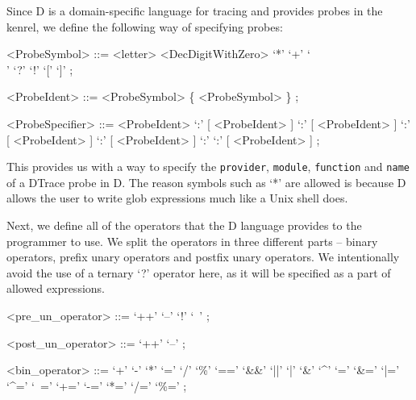 \noindent
Since D is a domain-specific language for tracing and provides probes in the
kenrel, we define the following way of specifying probes:

\begin{grammar}
<ProbeSymbol> ::=  <letter>
              \alt <DecDigitWithZero>
              \alt `*'
              \alt `+'
              \alt `\\'
              \alt `?'
              \alt `!'
              \alt `['
              \alt `]' ;

<ProbeIdent> ::= <ProbeSymbol> \{ <ProbeSymbol> \} ;

<ProbeSpecifier> ::=  <ProbeIdent>
                 \alt [ <ProbeIdent> ] `:' [ <ProbeIdent> ]
                 \alt [ <ProbeIdent> ] `:' [ <ProbeIdent> ] `:' [ <ProbeIdent> ]
                 \alt [ <ProbeIdent> ] `:' [ <ProbeIdent> ] `:' \newline
                      [ <ProbeIdent> ] `:' [ <ProbeIdent> ] ;
\end{grammar}

\noindent
This provides us with a way to specify the \texttt{provider}, \texttt{module},
\texttt{function} and \texttt{name} of a DTrace probe in D. The reason symbols
such as `*' are allowed is because D allows the user to write glob expressions
much like a Unix shell does. \newline

\noindent
Next, we define all of the operators that the D language provides to the
programmer to use. We split the operators in three different parts -- binary
operators, prefix unary operators and postfix unary operators. We intentionally
avoid the use of a ternary `?' operator here, as it will be specified as a part
of allowed expressions.
\begin{grammar}
<pre\_un\_operator> ::=  `++'
                    \alt `--'
                    \alt `!'
                    \alt `~' ;

<post\_un\_operator> ::=  `++'
                     \alt `--' ;

<bin\_operator> ::=  `+'
                \alt `-'
                \alt `*'
                \alt `='
                \alt `/'
                \alt `\%'
                \alt `=='
                \alt `&&'
                \alt `||'
                \alt `|'
                \alt `&'
                \alt `^'
                \alt `='
                \alt `&='
                \alt `|='
                \alt `^='
                \alt `~='
                \alt `+='
                \alt `-='
                \alt `*='
                \alt `/='
                \alt `\%=' ;
\end{grammar}

